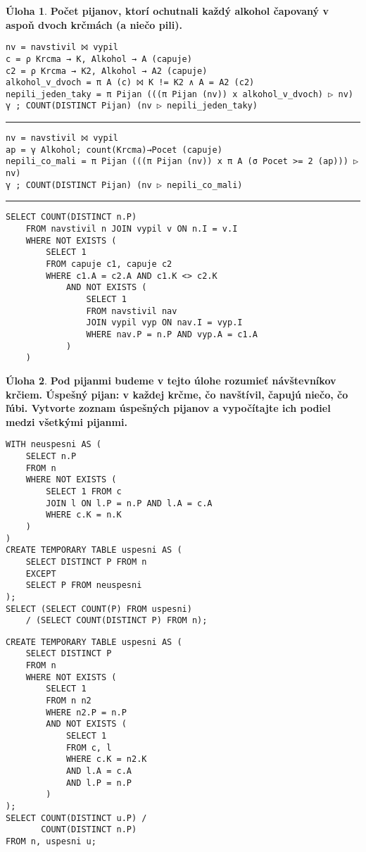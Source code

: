 \documentclass[10pt, a4paper]{article}
\theoremstyle{definition}
\newtheorem{problem}{Úloha}[section]
\def\hr{
    \bigskip
    \hrule
    \bigskip
}
\begin{document}
\begin{problem}
{\bf Počet pijanov, ktorí ochutnali každý alkohol čapovaný v aspoň dvoch krčmách (a niečo pili).}

\begin{verbatim}
nv = navstivil ⨝ vypil
c = ρ Krcma → K, Alkohol → A (capuje)
c2 = ρ Krcma → K2, Alkohol → A2 (capuje)
alkohol_v_dvoch = π A (c) ⨝ K != K2 ∧ A = A2 (c2)
nepili_jeden_taky = π Pijan (((π Pijan (nv)) x alkohol_v_dvoch) ▷ nv)
γ ; COUNT(DISTINCT Pijan) (nv ▷ nepili_jeden_taky)
\end{verbatim}

\hr

\begin{verbatim}
nv = navstivil ⨝ vypil
ap = γ Alkohol; count(Krcma)→Pocet (capuje)
nepili_co_mali = π Pijan (((π Pijan (nv)) x π A (σ Pocet >= 2 (ap))) ▷ nv)
γ ; COUNT(DISTINCT Pijan) (nv ▷ nepili_co_mali)
\end{verbatim}

\hr

\begin{verbatim}
SELECT COUNT(DISTINCT n.P)
    FROM navstivil n JOIN vypil v ON n.I = v.I
    WHERE NOT EXISTS (
        SELECT 1
        FROM capuje c1, capuje c2
        WHERE c1.A = c2.A AND c1.K <> c2.K
            AND NOT EXISTS (
                SELECT 1
                FROM navstivil nav 
                JOIN vypil vyp ON nav.I = vyp.I
                WHERE nav.P = n.P AND vyp.A = c1.A
            )
    )
\end{verbatim}
\end{problem}


\begin{problem}
{\bf Pod pijanmi budeme v tejto úlohe rozumieť návštevníkov krčiem.
Úspešný pijan: v každej krčme, čo navštívil, čapujú niečo, čo ľúbi.
Vytvorte zoznam úspešných pijanov a vypočítajte ich podiel medzi všetkými pijanmi.}\\[5mm]
\begin{minipage}[t]{0.49\textwidth}
\begin{verbatim}
WITH neuspesni AS (
    SELECT n.P
    FROM n
    WHERE NOT EXISTS (
        SELECT 1 FROM c
        JOIN l ON l.P = n.P AND l.A = c.A
        WHERE c.K = n.K
    )
)
CREATE TEMPORARY TABLE uspesni AS (
    SELECT DISTINCT P FROM n
    EXCEPT
    SELECT P FROM neuspesni
);
SELECT (SELECT COUNT(P) FROM uspesni)
    / (SELECT COUNT(DISTINCT P) FROM n);
\end{verbatim}
\end{minipage}
\begin{minipage}[t]{0.49\textwidth}
\begin{verbatim}
CREATE TEMPORARY TABLE uspesni AS (
    SELECT DISTINCT P
    FROM n
    WHERE NOT EXISTS (
        SELECT 1
        FROM n n2
        WHERE n2.P = n.P
        AND NOT EXISTS (
            SELECT 1
            FROM c, l
            WHERE c.K = n2.K
            AND l.A = c.A
            AND l.P = n.P
        )
);
SELECT COUNT(DISTINCT u.P) /
       COUNT(DISTINCT n.P)
FROM n, uspesni u;
\end{verbatim}
\end{minipage}
\end{problem}
\end{document}
